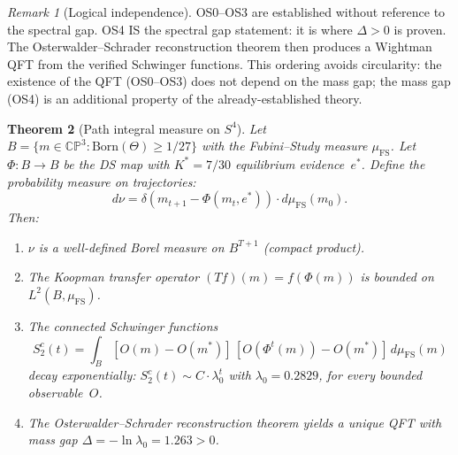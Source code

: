 \documentclass[11pt,a4paper]{article}
\newtheorem{theorem}{Theorem}[section]
\theoremstyle{definition}
\theoremstyle{remark}
\newtheorem{remark}[theorem]{Remark}
\newcommand{\CP}{\mathbb{CP}}
\begin{document}
\begin{remark}[Logical independence]
OS0--OS3 are established without reference to the spectral gap. OS4 IS the spectral gap statement: it is where $\Delta>0$ is proven. The Osterwalder--Schrader reconstruction theorem then produces a Wightman QFT from the verified Schwinger functions. This ordering avoids circularity: the existence of the QFT (OS0--OS3) does not depend on the mass gap; the mass gap (OS4) is an additional property of the already-established theory.
\end{remark}

\begin{theorem}[Path integral measure on $S^4$]\label{thm:measure}
Let $B=\{m\in\CP^3:\mathrm{Born}(\Theta)\geq 1/27\}$ with the Fubini--Study measure $\mu_{\mathrm{FS}}$. Let $\Phi:B\to B$ be the DS map with $K^*=7/30$ equilibrium evidence~$e^*$. Define the probability measure on trajectories:
\begin{equation}\label{eq:measure}
d\nu=\delta(m_{t+1}-\Phi(m_t,e^*))\cdot d\mu_{\mathrm{FS}}(m_0).
\end{equation}
Then:
\begin{enumerate}[nosep]
\item $\nu$ is a well-defined Borel measure on $B^{T+1}$ (compact product).
\item The Koopman transfer operator $(Tf)(m)=f(\Phi(m))$ is bounded on $L^2(B,\mu_{\mathrm{FS}})$.
\item The connected Schwinger functions
\begin{equation}\label{eq:schwinger}
S_2^c(t)=\int_B[O(m)-O(m^*)]\,[O(\Phi^t(m))-O(m^*)]\,d\mu_{\mathrm{FS}}(m)
\end{equation}
decay exponentially: $S_2^c(t)\sim C\cdot\lambda_0^t$ with $\lambda_0=0.2829$, for every bounded observable~$O$.
\item The Osterwalder--Schrader reconstruction theorem yields a unique QFT with mass gap $\Delta=-\ln\lambda_0=1.263>0$.
\end{enumerate}
\end{theorem}
\end{document}
